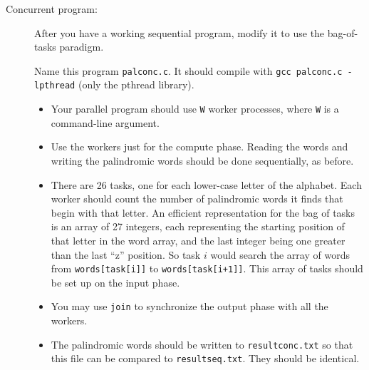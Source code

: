 \documentclass{article}
\begin{document}
\begin{description}
\item[Concurrent program:]
  After you have a working sequential program, modify it to use the
  bag-of-tasks paradigm.

  Name this program {\tt palconc.c}.  It should compile with {\tt gcc
    palconc.c -lpthread} (only the pthread library).
  \begin{itemize}
  \item
    Your parallel program should use {\tt W} worker
    processes, where {\tt W} is a command-line argument.
  \item
    Use the workers just for the compute phase.  Reading the words and
    writing the palindromic words should be done sequentially, as before.
  \item
    There are 26 tasks, one for each lower-case letter of the
    alphabet.  Each worker should count the number of palindromic
    words it finds that begin with that letter. An efficient
    representation for the bag of tasks is an array of 27 integers,
    each representing the starting position of that letter in the word
    array, and the last integer being one greater than the last ``z''
    position.  So task $i$ would search the array of words from
    {\tt words[task[i]]} to {\tt words[task[i+1]]}.  This array of
    tasks should be set up on the input phase.

  \item You may use {\tt join} to synchronize the output phase with
    all the workers.

\item The palindromic words should be written to {\tt resultconc.txt}
  so that this file can be compared to {\tt resultseq.txt}.  They
  should be identical.
  \end{itemize}  
  
\end{description}
\end{document}
